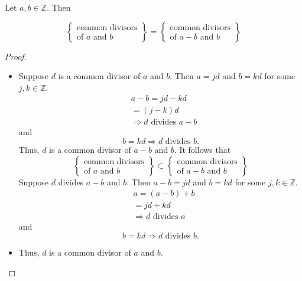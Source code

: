 \documentclass[11pt]{article}
\begin{document}
\begin{fact} Let $a, b \in \mathbb{Z}$. Then

    \[
        \left\{
        \begin{array}{l}
            \text{common divisors} \\
            \text{of } a \text{ and } b
        \end{array}
        \right\}
        =
        \left\{
        \begin{array}{l}
            \text{common divisors} \\
            \text{of } a - b \text{ and } b
        \end{array}
        \right\}
    \]
\end{fact}
\begin{proof}
    \begin{itemize}
        \item Suppose $d$ is a common divisor of $a$ and $b$. Then $a = jd$ and $b = kd$ for
              some $j, k \in \mathbb{Z}$.
              \[
                  \begin{aligned}
                       & a - b = jd - kd                      \\
                       & = (j - k)d                           \\
                       & \Rightarrow d \text{ divides } a - b
                  \end{aligned}
              \]
              and
              \[
                  b = kd \Rightarrow d \text{ divides } b.
              \]
              Thus, $d$ is a common divisor of $a - b$ and $b$. It follows that
              \[
                  \left\{
                  \begin{array}{l}
                      \text{common divisors} \\
                      \text{of } a \text{ and } b
                  \end{array}
                  \right\}
                  \subset
                  \left\{
                  \begin{array}{l}
                      \text{common divisors} \\
                      \text{of } a - b \text{ and } b
                  \end{array}
                  \right\}
              \]
              Suppose $d$ divides $a - b$ and $b$. Then $a - b = jd$ and $b = kd$ for some
              $j, k \in \mathbb{Z}$.
              \[
                  \begin{aligned}
                       & a = (a - b) + b                  \\
                       & = jd + kd                        \\
                       & \Rightarrow d \text{ divides } a
                  \end{aligned}
              \]
              and
              \[
                  b = kd \Rightarrow d \text{ divides } b.
              \]
        \item Thus, $d$ is a common divisor of $a$ and $b$.
    \end{itemize}
\end{proof}
\end{document}
